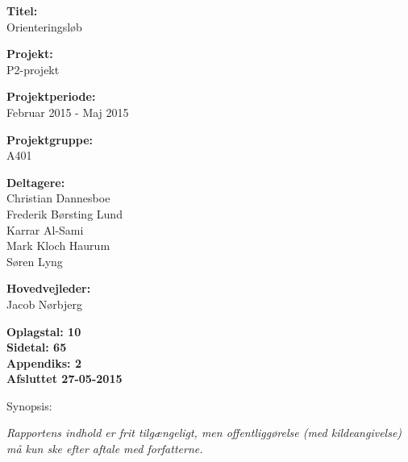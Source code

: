 \begin{minipage}[t]{0.48\textwidth}
\textbf{Titel:} \\[5pt]\bigskip\hspace{2ex}
Orienteringsløb

\textbf{Projekt:} \\[5pt]\bigskip\hspace{2ex}
P2-projekt

\textbf{Projektperiode:} \\[5pt]\bigskip\hspace{2ex}
Februar 2015 - Maj 2015

\textbf{Projektgruppe:} \\[5pt]\bigskip\hspace{2ex}
A401	

\textbf{Deltagere:} \\[5pt]\hspace*{2ex}
Christian Dannesboe \\\hspace*{2ex}
Frederik Børsting Lund \\\hspace*{2ex}
Karrar Al-Sami \\\hspace*{2ex}
Mark Kloch Haurum \\\hspace*{2ex}
Søren Lyng \\\hspace*{2ex}

\textbf{Hovedvejleder:} \\[5pt]\hspace*{2ex}
Jacob Nørbjerg \\\bigskip\hspace{2ex}

\hspace*{2ex}
\bigskip\hspace{2ex}
\vspace*{1cm}

\textbf{Oplagstal: 10} \\
\textbf{Sidetal: 65} \\
\textbf{Appendiks: 2} \\ 
\textbf{Afsluttet 27-05-2015}

\end{minipage}
\hfill
\begin{minipage}[t]{0.483\textwidth}
Synopsis: \\[5pt]
\fbox{\parbox{7cm}{\bigskip\bigskip}}
\end{minipage}

\vfill

{\footnotesize\itshape Rapportens indhold er frit tilgængeligt, men offentliggørelse (med kildeangivelse) må kun ske efter aftale med forfatterne.}

